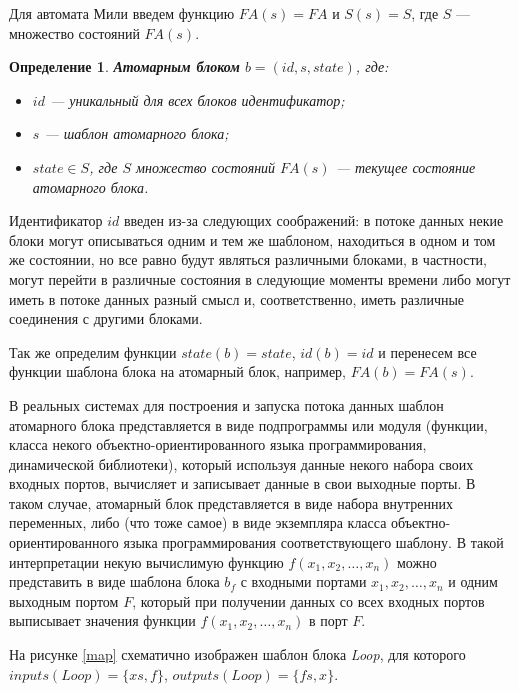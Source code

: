 \documentclass[10pt,a4paper]{article}
\newtheorem{defen}{Определение}
\newcommand{\FA}{F\!A}
\begin{document}
Для автомата Мили введем функцию $\FA(s) = \FA$ и $S(s) = S$, где $S$ --- множество состояний $\FA(s)$.

\begin{defen}
  \textbf{Атомарным блоком} $b = (id, s, state)$, где:
  \begin{itemize}
    \item $id$ --- уникальный для всех блоков идентификатор;
    \item $s$ --- шаблон атомарного блока;
    \item $state \in S$, где $S$ множество состояний $\FA(s)$ --- текущее состояние атомарного блока.
  \end{itemize}
\end{defen}

Идентификатор $id$ введен из-за следующих соображений: в потоке данных некие блоки могут описываться одним и тем же шаблоном, находиться в одном и том же состоянии,
но все равно будут являться различными блоками, в частности, могут перейти в различные состояния в следующие моменты времени либо могут иметь в потоке данных разный смысл и, соответственно, иметь различные соединения с другими блоками.

Так же определим функции $state(b) = state$, $id(b) = id$ и перенесем все функции шаблона блока на атомарный блок, например, $\FA(b) = \FA(s)$.

В реальных системах для построения и запуска потока данных шаблон атомарного блока представляется в виде подпрограммы или модуля
(функции, класса некого объектно-ориентированного языка программирования, динамической библиотеки), который используя данные некого набора своих входных портов, вычисляет
и записывает данные в свои выходные порты. В таком случае, атомарный блок представляется в виде набора внутренних переменных,
либо (что тоже самое) в виде экземпляра класса объектно-ориентированного языка программирования соответствующего шаблону.
В такой интерпретации некую вычислимую функцию $f(x_1, x_2, \dots, x_n)$ можно представить в виде шаблона блока $b_f$
с входными портами $x_1, x_2, \dots, x_n$ и одним выходным портом $F$, который при получении данных со всех входных портов
выписывает значения функции $f(x_1, x_2, \dots, x_n)$ в порт $F$.

На рисунке \ref{map} схематично изображен шаблон блока \textit{Loop}, для которого $inputs(Loop) = \{xs, f\}$, $outputs(Loop) = \{fs, x\}$.
\end{document}
